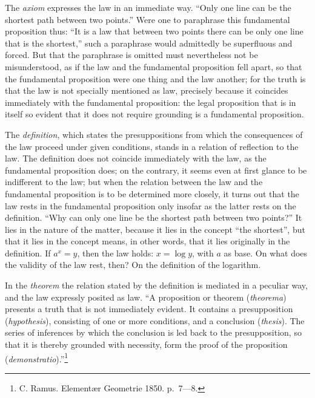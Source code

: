 \documentclass[12pt,a4paper,openany]{book}
\newcommand{\opage}[1]{\marginnote{\footnotesize\textit{[#1]}}}
\begin{document}
The \emph{axiom} expresses the law in an immediate way.
``Only one line can be the shortest path between two points.''
Were one to paraphrase this fundamental proposition thus:
``It is a law that between two points there can be only
one line that is the shortest,'' such a paraphrase
would admittedly be superfluous and forced. But that the
paraphrase is omitted must nevertheless not be misunderstood, as if
the law and the fundamental proposition fell apart, so that
the fundamental proposition were one thing and the law another; for the truth
is that the law is not specially mentioned as law, precisely because it
coincides immediately with the fundamental proposition: the legal proposition
that is in itself so evident that it does not require
grounding is a fundamental proposition.

The \emph{definition}, which states the presuppositions from
which the consequences of the law proceed under given conditions,
stands in a relation of reflection to the law. The definition does not coincide immediately
with the law, as the fundamental proposition does; on the contrary, it seems even at first glance to
be indifferent to the law; but when the relation between
the law and the fundamental proposition is to be determined more closely, it
turns out that the law rests in the fundamental proposition only insofar as
the latter rests on the definition. ``Why can only one line
be the shortest path between two points?'' It lies in the
nature of the matter, because it lies in the concept ``the shortest'',
but that it lies in the concept means, in other words,
that it lies originally in the definition. If $a^{x}=y$,
\setcounter{footnote}{0}%
\opage{18}then the law holds: $x=\log y$, with $a$ as base. On what
does the validity of the law rest, then? On the definition of the logarithm.

In the \emph{theorem} the relation stated by the definition is
mediated in a peculiar way, and the law expressly
posited as law. ``A proposition or theorem (\textit{theorema})
presents a truth that is not immediately evident.
It contains a presupposition (\textit{hypothesis}), consisting of
one or more conditions, and a conclusion (\textit{thesis}). The
series of inferences by which the conclusion is led back
to the presupposition, so that it is thereby grounded with necessity,
form the proof of the proposition (\textit{demonstratio}).''\footnote[1]{C. Ramus. Elementær Geometrie 1850. p.\ 7—8.}
\end{document}
